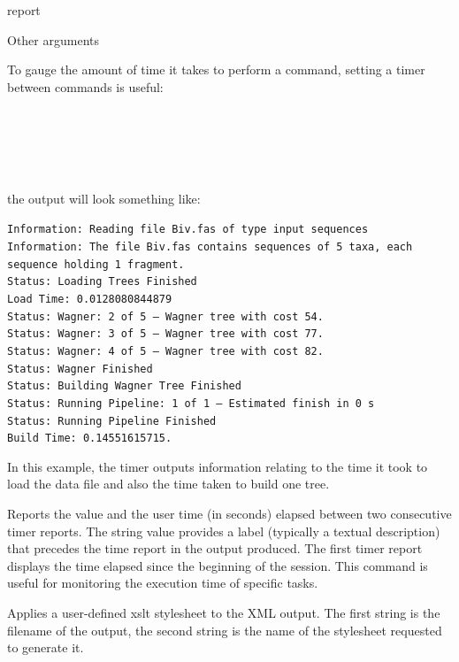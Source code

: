 \begin{command}{report}{}
\begin{arguments}
\begin{argumentgroup}{Other arguments}
\begin{statement}
To gauge the amount of time it takes \poy to perform a command, 
setting a timer between commands is useful:
\begin{flushleft}
\\
\\
\\
\\
\end{flushleft}

the output will look something like:
\begin{flushleft}   
\texttt{Information: Reading file Biv.fas of type input sequences\\
Information: The file Biv.fas contains sequences of 5 taxa, each
sequence holding 1 fragment.\\
Status: Loading Trees Finished\\
Load Time: 0.0128080844879\\
Status: Wagner: 2 of 5 -- Wagner tree with cost 54.\\
Status: Wagner: 3 of 5 -- Wagner tree with cost 77.\\
Status: Wagner: 4 of 5 -- Wagner tree with cost 82.\\
Status: Wagner Finished\\
Status: Building Wagner Tree Finished\\
Status: Running Pipeline: 1 of 1 -- Estimated finish in 0 s\\
Status: Running Pipeline Finished\\
Build Time: 0.14551615715.}
\end{flushleft}
In this example, the timer outputs information relating to the time it took 
\poy to load the data file and also the time taken to build one tree.
\end{statement}

{Reports the value and the user time (in seconds) elapsed between
two consecutive timer reports. The string value provides a label
(typically a textual description) that precedes the time report
in the output produced.
The first timer report displays the time elapsed since the beginning of the
\poy session. This command is useful for monitoring the execution time
of specific tasks.}
{}

{Applies a user-defined xslt stylesheet to the XML output. The first string is
the filename of the output, the second string is the name of the stylesheet
requested to generate it.}
{}


\end{argumentgroup}
\end{arguments}
\end{command}
